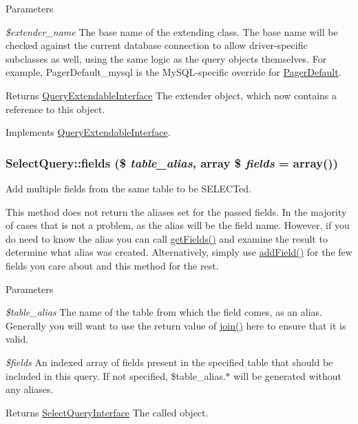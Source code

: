 \begin{DoxyParams}{Parameters}
\item[{\em \$extender\_\-name}]The base name of the extending class. The base name will be checked against the current database connection to allow driver-\/specific subclasses as well, using the same logic as the query objects themselves. For example, PagerDefault\_\-mysql is the MySQL-\/specific override for \hyperlink{classPagerDefault}{PagerDefault}. \end{DoxyParams}
\begin{DoxyReturn}{Returns}
\hyperlink{interfaceQueryExtendableInterface}{QueryExtendableInterface} The extender object, which now contains a reference to this object. 
\end{DoxyReturn}


Implements \hyperlink{interfaceQueryExtendableInterface_a247fadddaaecd7806d493ba85c388e65}{QueryExtendableInterface}.\hypertarget{classSelectQuery_ab240a4ee46566adaff68b364c7c60699}{
\subsubsection[{fields}]{\setlength{\rightskip}{0pt plus 5cm}SelectQuery::fields (\$ {\em table\_\-alias}, \/  array \$ {\em fields} = {\ttfamily array()})}}
\label{classSelectQuery_ab240a4ee46566adaff68b364c7c60699}
Add multiple fields from the same table to be SELECTed.

This method does not return the aliases set for the passed fields. In the majority of cases that is not a problem, as the alias will be the field name. However, if you do need to know the alias you can call \hyperlink{classSelectQuery_aa9b27e2c4eb533ba25af4ca37ca3554f}{getFields()} and examine the result to determine what alias was created. Alternatively, simply use \hyperlink{classSelectQuery_a8f5cef012b0f3111a5e6b8bcc47bacea}{addField()} for the few fields you care about and this method for the rest.


\begin{DoxyParams}{Parameters}
\item[{\em \$table\_\-alias}]The name of the table from which the field comes, as an alias. Generally you will want to use the return value of \hyperlink{classSelectQuery_aceff7fc4040a74f693f2fc2548a99c17}{join()} here to ensure that it is valid. \item[{\em \$fields}]An indexed array of fields present in the specified table that should be included in this query. If not specified, \$table\_\-alias.$\ast$ will be generated without any aliases. \end{DoxyParams}
\begin{DoxyReturn}{Returns}
\hyperlink{interfaceSelectQueryInterface}{SelectQueryInterface} The called object. 
\end{DoxyReturn}


